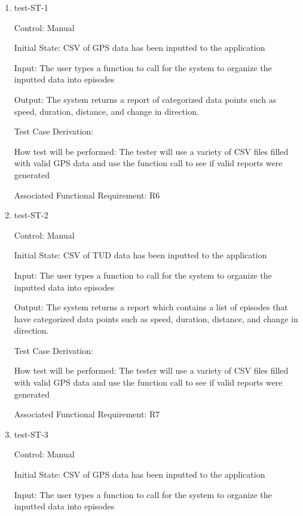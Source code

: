 \documentclass[12pt, titlepage]{article}
\begin{document}
\begin{enumerate}

\item{test-ST-1\\}

Control: Manual
					
Initial State: CSV of GPS data has been inputted to the application
					
Input: The user types a function to call for the system to organize the inputted data into episodes 
					
Output: The system returns a report of categorized data points such as speed, duration, distance, and change in direction.

Test Case Derivation: 

How test will be performed: The tester will use a variety of CSV files filled with valid GPS data and use the function call to see if valid reports were generated


Associated Functional Requirement: R6



\item{test-ST-2\\}

Control: Manual
					
Initial State: CSV of TUD data has been inputted to the application
					
Input: The user types a function to call for the system to organize the inputted data into episodes 
					
Output: The system returns a report which contains a list of episodes that have categorized data points such as speed, duration, distance, and change in direction.

Test Case Derivation: 

How test will be performed: The tester will use a variety of CSV files filled with valid GPS data and use the function call to see if valid reports were generated


Associated Functional Requirement: R7

\item{test-ST-3\\}

Control: Manual
					
Initial State: CSV of GPS data has been inputted to the application
					
Input: The user types a function to call for the system to organize the inputted data into episodes 
					

\end{enumerate}
\end{document}
